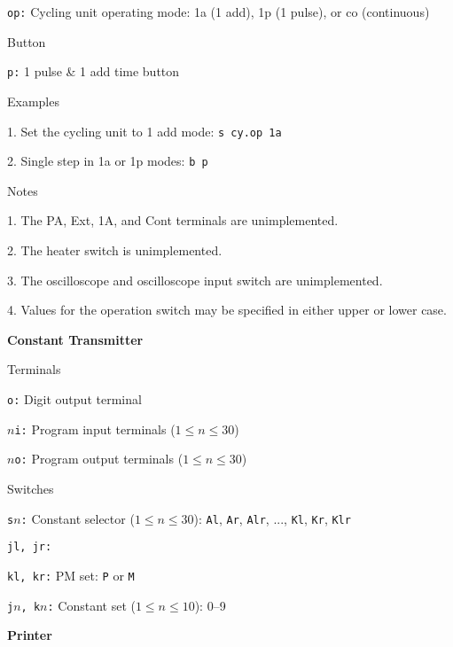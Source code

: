 {\advance\leftskip 0.5in
\item{\tt op:} Cycling unit operating mode: 1a (1 add), 1p (1 pulse), or co (continuous)

}

Button

{\advance\leftskip 0.5in
\item{\tt p:} 1 pulse \& 1 add time button

}

Examples

{\advance\leftskip 0.5in
\item{1.} Set the cycling unit to 1 add mode:  {\tt s cy.op 1a}
\item{2.} Single step in 1a or 1p modes: {\tt b p}

}

Notes

{\advance\leftskip 0.5in
\item{1.} The PA, Ext, 1A, and Cont terminals are unimplemented.
\item{2.} The heater switch is unimplemented.
\item{3.} The oscilloscope and oscilloscope input switch are unimplemented.
\item{4.} Values for the operation switch may be specified in either upper
or lower case.

}

\vfill\eject
\vskip 12pt
\noindent
{\bf Constant Transmitter}

Terminals

{\advance\leftskip 0.75in
\item{\tt o:} Digit output terminal
\item{\tt $n$i:} Program input terminals ($1\le n\le 30$)
\item{\tt $n$o:} Program output terminals ($1\le n\le 30$)

}

Switches

{\advance\leftskip 0.75in
\item{\tt s$n$:} Constant selector ($1\le n\le 30$): {\tt Al}, {\tt Ar}, {\tt Alr}, ..., {\tt Kl}, {\tt Kr}, {\tt Klr}
\item{\tt jl, jr:}
\item{\tt kl, kr:} PM set: {\tt P} or {\tt M}
\item{\tt j$n$, k$n$:} Constant set ($1\le n\le 10$): 0--9

}

\vskip 12pt
\noindent
{\bf Printer}

